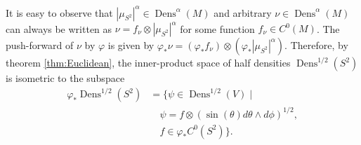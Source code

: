 \documentclass[letterpaper, 12 pt]{amsart}
\newtheorem{prop}[thm]{Proposition}
\DeclareMathOperator{\Dens}{Dens}
\begin{document}
  It is easy to observe that $|\mu_{S^2}|^\alpha \in \Dens^\alpha(M)$
  and arbitrary $\nu \in \Dens^\alpha(M)$ can always be written
  as $\nu = f_{\nu} \otimes |\mu_{S^2}|^\alpha$ for some function 
  $f_\nu \in C^0(M)$.
  The push-forward of $\nu$ by $\varphi$ is given by
  $\varphi_*\nu = (\varphi_*f_\nu) \otimes (\varphi_*|\mu_{S^2}|^\alpha)$.
  Therefore, by theorem \ref{thm:Euclidean},
  the inner-product space of half densities $\Dens^{1/2}(S^2)$
  is isometric to the subspace
  \begin{align*}
    \varphi_* \Dens^{1/2}(S^2) &= \{ \psi \in \Dens^{1/2}(V) \mid \\
    & \quad \psi = f \otimes  (\sin(\theta) d\theta \wedge d\phi)^{1/2} ,\\
    & \quad f \in \varphi_*C^0(S^2) \}.
  \end{align*}



\end{document}
